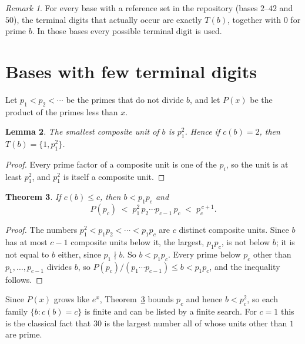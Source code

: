 \documentclass[11pt]{article}
\newtheorem{theorem}{Theorem}
\newtheorem{lemma}[theorem]{Lemma}
\theoremstyle{remark}
\newtheorem{remark}[theorem]{Remark}
\begin{document}
\begin{remark}
For every base with a reference set in the repository (bases $2$--$42$ and $50$), the terminal digits that actually occur are exactly $T(b)$, together with $0$ for prime $b$. In those bases every possible terminal digit is used.
\end{remark}

\section{Bases with few terminal digits}

Let $p_1<p_2<\cdots$ be the primes that do not divide $b$, and let $P(x)$ be the product of the primes less than $x$.

\begin{lemma}\label{lem:smallest}
The smallest composite unit of $b$ is $p_1^2$. Hence if $c(b)=2$, then $T(b)=\{1,p_1^2\}$.
\end{lemma}

\begin{proof}
Every prime factor of a composite unit is one of the $p_i$, so the unit is at least $p_1^2$, and $p_1^2$ is itself a composite unit.
\end{proof}

\begin{theorem}\label{thm:bound}
If $c(b)\le c$, then $b<p_1p_c$ and
\[
P(p_c)\;<\;p_1^2\,p_2\cdots p_{c-1}\,p_c\;<\;p_c^{\,c+1}.
\]
\end{theorem}

\begin{proof}
The numbers $p_1^2<p_1p_2<\cdots<p_1p_c$ are $c$ distinct composite units. Since $b$ has at most $c-1$ composite units below it, the largest, $p_1p_c$, is not below $b$; it is not equal to $b$ either, since $p_1\nmid b$. So $b<p_1p_c$. Every prime below $p_c$ other than $p_1,\dots,p_{c-1}$ divides $b$, so $P(p_c)/(p_1\cdots p_{c-1})\le b<p_1p_c$, and the inequality follows.
\end{proof}

Since $P(x)$ grows like $e^{x}$, Theorem~\ref{thm:bound} bounds $p_c$ and hence $b<p_c^2$, so each family $\{b: c(b)=c\}$ is finite and can be listed by a finite search. For $c=1$ this is the classical fact that $30$ is the largest number all of whose units other than $1$ are prime.
\end{document}
